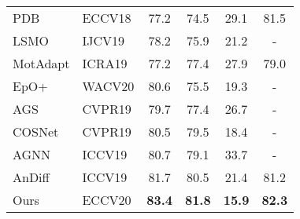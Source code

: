 \documentclass[runningheads]{llncs}
\begin{document}
\begin{table*}[t!]
{\begin{tabular}{l|l|ccc|c}
			PDB \cite{vos_pdb} & ECCV18&  77.2 &74.5 &29.1 &81.5\\
			LSMO \cite{vos_lsmo} &IJCV19&78.2&	75.9&  21.2 &-\\
			MotAdapt \cite{motadapt} &ICRA19& 77.2&	77.4&   27.9&79.0\\
			EpO+ \cite{vos_epo}&WACV20&80.6	&	75.5& 19.3 &-\\
			AGS \cite{vos_ags}&		CVPR19 &	79.7&	77.4&	26.7   &-\\
			COSNet \cite{vos_cosnet}	&CVPR19		&80.5&	79.5	&	18.4 &-\\
			AGNN \cite{vos_agnn} & ICCV19 & 80.7 & 79.1&  33.7 &-\\
			AnDiff \cite{vos_andiff}&ICCV19		&	81.7	&80.5&	21.4&81.2\\
			\hline
			Ours &ECCV20 & \textbf{83.4} &\textbf{81.8} &\textbf{15.9}&\textbf{82.3}\\	
			\bottomrule
		\end{tabular}
	}	
	\label{davis16_sota}
\end{table*}
\end{document}
